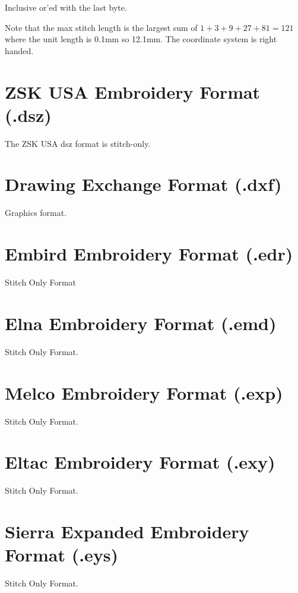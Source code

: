 \documentclass{report}
\begin{document}
Inclusive or'ed with the last byte.

Note that the max stitch length is the largest sum of $1+3+9+27+81=121$ where the unit length is 0.1mm so 12.1mm. The coordinate system is right handed.

\section{ZSK USA Embroidery Format (.dsz)}

The ZSK USA dsz format is stitch-only.

\section{Drawing Exchange Format (.dxf)}

Graphics format.

\section{Embird Embroidery Format (.edr)}

Stitch Only Format

\section{Elna Embroidery Format (.emd)}

Stitch Only Format.

\section{Melco Embroidery Format (.exp)}

Stitch Only Format.

\section{Eltac Embroidery Format (.exy)}

Stitch Only Format.

\section{Sierra Expanded Embroidery Format (.eys)}

Stitch Only Format.
\end{document}
